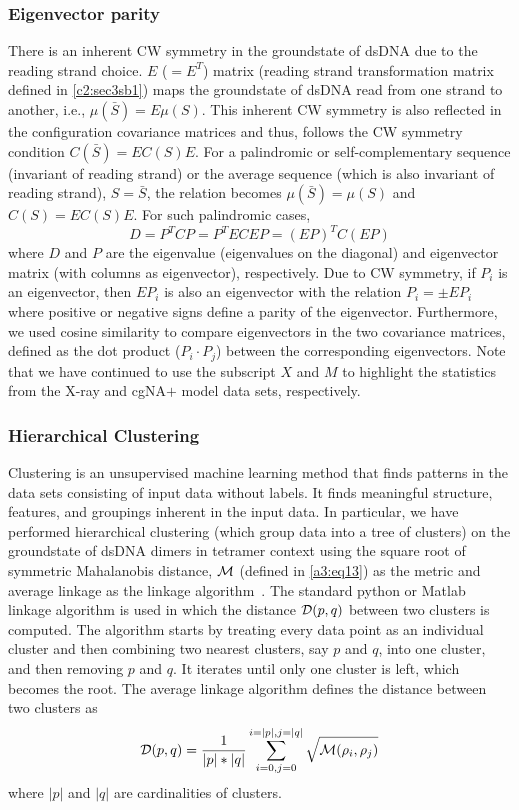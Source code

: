 \subsubsection{Eigenvector parity}\label{ss:parity}
There is an inherent CW symmetry in the groundstate of dsDNA due to the reading strand choice. 
$E$ ($= E^T$) matrix (reading strand transformation matrix defined in \cref{c2:sec3sb1}) maps the groundstate of dsDNA read from one strand to another, i.e., $\mu(\bar{S})=E\mu (S)$. 
This inherent CW symmetry is also reflected in the configuration covariance matrices and thus, follows the CW symmetry condition $C(\bar{S})= EC(S)E$.
For a palindromic or self-complementary sequence (invariant of reading strand) or the average sequence (which is also invariant of reading strand), $S=\bar{S}$, the relation becomes $\mu(\bar{S})=\mu (S)$ and $C(S)= EC(S)E$. 
For such palindromic cases,
\begin{equation}
    D = P^TCP = P^TECEP = (EP)^TC(EP)
\end{equation}
where $D$ and $P$ are the eigenvalue (eigenvalues on the diagonal) and eigenvector matrix (with columns as eigenvector), respectively. 
Due to CW symmetry, if $P_i$ is an eigenvector, then $EP_i$ is also an eigenvector with the relation $P_i=\pm EP_i$ where positive or negative signs define a parity of the eigenvector.
Furthermore, we used cosine similarity to compare eigenvectors in the two covariance matrices, defined as the dot product ($P_i \cdot P_j$) between the corresponding eigenvectors.
Note that we have continued to use the subscript $X$ and $M$ to highlight the statistics from the X-ray and cgNA$+$ model data sets, respectively. 

\subsubsection{Hierarchical Clustering}\label{ss:cluster}
Clustering is an unsupervised machine learning method that finds patterns in the data sets consisting of input data without labels. 
It finds meaningful structure, features, and groupings inherent in the input data.
In particular, we have performed hierarchical clustering (which group data into a tree of clusters) on the groundstate of dsDNA dimers in tetramer context using the square root of symmetric Mahalanobis distance, $\mathcal{M}$ (defined in \cref{a3:eq13}) as the metric and average linkage as the linkage algorithm~\cite{clustering_muller}.
The standard python or Matlab linkage algorithm is used in which the distance ${\mathcal D}(p,q)$ between two clusters is computed. 
The algorithm starts by treating every data point as an individual cluster and then 
combining two nearest clusters, say $p$ and $q$, into one cluster, and then removing $p$ and $q$.
It iterates until only one cluster is left, which becomes the root. 
The average linkage algorithm defines the distance between two clusters as 
\begin{equation}
{\mathcal D}(p,q) = \frac{1}{|p|*|q|}\sum_{i=0,j=0}^{i=|p|,j=|q|} \sqrt{\mathcal{M}(\rho_i,\rho_j)}
\end{equation}
where $|p|$ and $|q|$ are cardinalities of clusters. \clearpage

